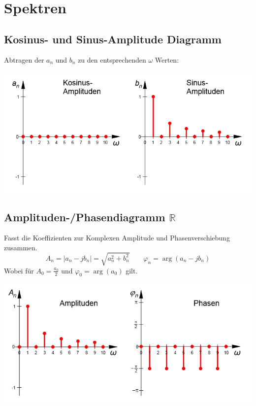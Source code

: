 \section{Spektren}
\subsection{Kosinus- und Sinus-Amplitude Diagramm}
Abtragen der $a_n$ und $b_n$ zu den entsprechenden $\omega$ Werten:\\
\begin{center}
	\includegraphics[width=\columnwidth]{Images/amplituden_diagram}
\end{center}


\subsection{Amplituden-/Phasendiagramm $\mathbb{R}$}
Fasst die Koeffizienten zur Komplexen Amplitude und Phasenverschiebung zusammen.\\
\[
A_n = \left|a_n - jb_n\right| = \sqrt{a_n^2 + b_n^2} \qquad \varphi_n = \arg(a_n - jb_n)
\]
Wobei für $A_0 = \frac{a_0}{2}$ und $\varphi_0 = \arg(a_0)$ gilt.

\begin{center}
	\includegraphics[width=\columnwidth]{Images/phasen_diagram}
\end{center}

